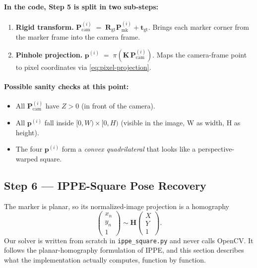 \documentclass[11pt,a4paper]{article}
\theoremstyle{definition}
\theoremstyle{plain}
\theoremstyle{remark}
\newcommand{\code}[1]{\texttt{#1}}
\newcommand{\Rgt}{\mathbf{R}_{\text{gt}}}
\newcommand{\tgt}{\mathbf{t}_{\text{gt}}}
\newcommand{\Pcam}{\mathbf{P}_{\text{cam}}}
\newcommand{\Pmark}{\mathbf{P}_{\text{mk}}}
\newcommand{\KK}{\mathbf{K}}
\begin{document}
\paragraph{In the code, Step 5 is split in two sub-steps:}
\begin{enumerate}[label=(\alph*)]
  \item \textbf{Rigid transform.} $\Pcam^{(i)} \;=\; \Rgt \Pmark^{(i)} + \tgt$.
        Brings each marker corner from the marker frame into the camera frame.
  \item \textbf{Pinhole projection.} $\mathbf{p}^{(i)} \;=\; \pi(\KK\,\Pcam^{(i)})$.
        Maps the camera-frame point to pixel coordinates via
        \eqref{eq:pixel-projection}.
\end{enumerate}

\paragraph{Possible sanity checks at this point:}
\begin{itemize}[leftmargin=*]
  \item All $\Pcam^{(i)}$ have $Z > 0$ (in front of the camera).
  \item All $\mathbf{p}^{(i)}$ fall inside $[0, W) \times [0, H)$ (visible in the image, W as width, H as height).
  \item The four $\mathbf{p}^{(i)}$ form a \emph{convex quadrilateral} that looks
        like a perspective-warped square.
\end{itemize}

\subsection{Step 6 --- IPPE-Square Pose Recovery}
\label{sec:ippe}

The marker is planar, so its normalized-image projection is a homography
\begin{equation}
  \begin{pmatrix} x_n \\ y_n \\ 1 \end{pmatrix}
  \sim \mathbf{H}\begin{pmatrix} X \\ Y \\ 1 \end{pmatrix}.
\end{equation}
Our solver is written from scratch in \code{ippe\_square.py} and never calls
OpenCV. It follows the planar-homography formulation of IPPE, and this section
describes what the implementation actually computes, function by function.
\end{document}

